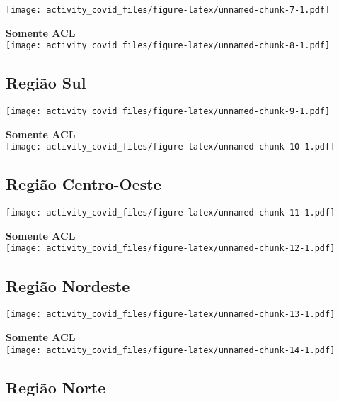 \documentclass[
]{article}
\begin{document}
\texttt{[image: activity\_covid\_files/figure-latex/unnamed-chunk-7-1.pdf]}

\pagebreak

\textbf{Somente ACL}\\
\texttt{[image: activity\_covid\_files/figure-latex/unnamed-chunk-8-1.pdf]}

\pagebreak

\hypertarget{regiuxe3o-sul-1}{%
\subsection{Região Sul}\label{regiuxe3o-sul-1}}

\texttt{[image: activity\_covid\_files/figure-latex/unnamed-chunk-9-1.pdf]}

\pagebreak

\textbf{Somente ACL}\\
\texttt{[image: activity\_covid\_files/figure-latex/unnamed-chunk-10-1.pdf]}

\pagebreak

\hypertarget{regiuxe3o-centro-oeste-1}{%
\subsection{Região Centro-Oeste}\label{regiuxe3o-centro-oeste-1}}

\texttt{[image: activity\_covid\_files/figure-latex/unnamed-chunk-11-1.pdf]}

\pagebreak

\textbf{Somente ACL}\\
\texttt{[image: activity\_covid\_files/figure-latex/unnamed-chunk-12-1.pdf]}

\pagebreak

\hypertarget{regiuxe3o-nordeste-1}{%
\subsection{Região Nordeste}\label{regiuxe3o-nordeste-1}}

\texttt{[image: activity\_covid\_files/figure-latex/unnamed-chunk-13-1.pdf]}

\pagebreak

\textbf{Somente ACL}\\
\texttt{[image: activity\_covid\_files/figure-latex/unnamed-chunk-14-1.pdf]}

\pagebreak

\hypertarget{regiuxe3o-norte-1}{%
\subsection{Região Norte}\label{regiuxe3o-norte-1}}
\end{document}
